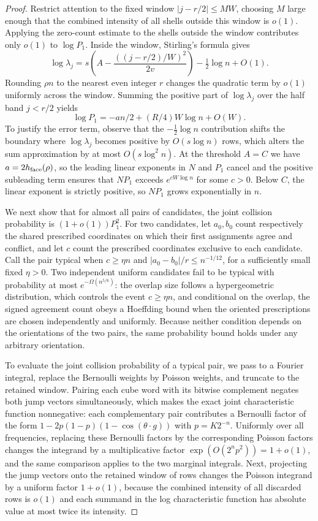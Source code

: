 \begin{proof}
Restrict attention to the fixed window \(|j-r/2|\le MW\), choosing \(M\) large enough that the combined intensity of all shells outside this window is \(o(1)\). Applying the zero-count estimate to the shells outside the window contributes only \(o(1)\) to \(\log P_1\). Inside the window, Stirling's formula gives
\[
 \log\lambda_j=s\left(A-\frac{((j-r/2)/W)^2}{2v}\right)
                 -\tfrac12\log n+O(1).
\]
Rounding \(\rho n\) to the nearest even integer \(r\) changes the quadratic term by \(o(1)\) uniformly across the window. Summing the positive part of \(\log\lambda_j\) over the half band \(j<r/2\) yields
\[
 \log P_1=-an/2+(R/4)W\log n+O(W).
\]
To justify the error term, observe that the \(-\tfrac12\log n\) contribution shifts the boundary where \(\log\lambda_j\) becomes positive by \(O(s\log n)\) rows, which alters the sum approximation by at most \(O(s\log^2n)\). At the threshold \(A=C\) we have \(a=2h_{\rm face}(\rho)\), so the leading linear exponents in \(N\) and \(P_1\) cancel and the positive subleading term ensures that \(NP_1\) exceeds \(e^{c W\log n}\) for some \(c>0\). Below \(C\), the linear exponent is strictly positive, so \(NP_1\) grows exponentially in \(n\).

We next show that for almost all pairs of candidates, the joint collision probability is \((1+o(1))P_1^2\). For two candidates, let \(a_0,b_0\) count respectively the shared prescribed coordinates on which their first assignments agree and conflict, and let \(c\) count the prescribed coordinates exclusive to each candidate. Call the pair typical when \(c\ge\eta n\) and \(|a_0-b_0|/r\le n^{-1/12}\), for a sufficiently small fixed \(\eta>0\). Two independent uniform candidates fail to be typical with probability at most \(e^{-\Omega(n^{5/6})}\): the overlap size follows a hypergeometric distribution, which controls the event \(c\ge\eta n\), and conditional on the overlap, the signed agreement count obeys a Hoeffding bound when the oriented prescriptions are chosen independently and uniformly. Because neither condition depends on the orientations of the two pairs, the same probability bound holds under any arbitrary orientation.

To evaluate the joint collision probability of a typical pair, we pass to a Fourier integral, replace the Bernoulli weights by Poisson weights, and truncate to the retained window. Pairing each cube word with its bitwise complement negates both jump vectors simultaneously, which makes the exact joint characteristic function nonnegative: each complementary pair contributes a Bernoulli factor of the form \(1-2p(1-p)(1-\cos(\theta\cdot g))\) with \(p=K2^{-n}\). Uniformly over all frequencies, replacing these Bernoulli factors by the corresponding Poisson factors changes the integrand by a multiplicative factor \(\exp(O(2^np^2))=1+o(1)\), and the same comparison applies to the two marginal integrals. Next, projecting the jump vectors onto the retained window of rows changes the Poisson integrand by a uniform factor \(1+o(1)\), because the combined intensity of all discarded rows is \(o(1)\) and each summand in the log characteristic function has absolute value at most twice its intensity.


\end{proof}
